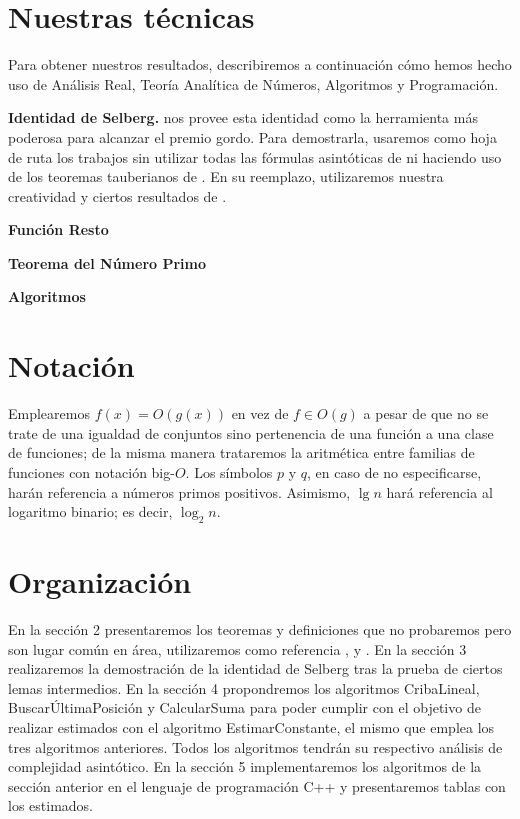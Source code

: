 \section{Nuestras t\'ecnicas}
Para obtener nuestros resultados,
describiremos a continuaci\'on
c\'omo hemos hecho uso de
An\'alisis Real,
Teor\'ia Anal\'itica de N\'umeros,
Algoritmos y
Programaci\'on.

\textbf{Identidad de Selberg.}
\cite{Selberg1949} nos provee esta identidad como
la herramienta m\'as poderosa para alcanzar el premio gordo.
Para demostrarla, usaremos como hoja de ruta los trabajos
\cite{Diamond1982, Choudhary2017}
sin utilizar todas las f\'ormulas asint\'oticas de \cite{Chebyshev1852}
ni haciendo uso de los teoremas tauberianos de \cite{Shapiro1959}.
En su reemplazo, utilizaremos nuestra creatividad y
ciertos resultados de \cite{Mertens1874, TI1951}.

\textbf{Funci\'on Resto}

\textbf{Teorema del N\'umero Primo}


\textbf{Algoritmos}

\section{Notaci\'on}
Emplearemos \(f(x) = O(g(x))\) en vez de \(f \in O(g)\)
a pesar de que no se trate de una igualdad de conjuntos sino
pertenencia de una funci\'on a una clase de funciones; 
de la misma manera
trataremos la aritm\'etica entre familias de funciones
con notaci\'on big-\(O\).
Los s\'imbolos \(p\) y \(q\), en caso de no especificarse,
har\'an referencia a n\'umeros primos positivos.
Asimismo, \(\lg n\) har\'a referencia al logaritmo binario;
es decir, \(\log_2 n\).

\section{Organizaci\'on}
En la secci\'on 2 presentaremos los teoremas y definiciones que no probaremos
pero  son lugar com\'un en \'area,
utilizaremos como referencia
\cite{Apostol1976},
\cite{CLRS2009} y
\cite{FGST2020}.
En la secci\'on 3 realizaremos la demostraci\'on de la identidad de Selberg
tras la prueba de ciertos lemas intermedios.
En la secci\'on 4 propondremos los algoritmos CribaLineal,
Buscar\'UltimaPosici\'on y CalcularSuma para poder cumplir con
el objetivo de realizar estimados con el algoritmo EstimarConstante,
el mismo que emplea los tres algoritmos anteriores. 
Todos los algoritmos tendr\'an su respectivo an\'alisis de complejidad asint\'otico.
En la secci\'on 5 implementaremos los algoritmos de la secci\'on anterior
en el lenguaje de programaci\'on C++ y presentaremos tablas con los estimados.
